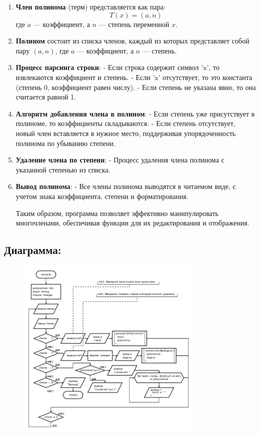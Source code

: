 \documentclass[14pt,a4paper]{article}
\begin{document}
\begin{enumerate}
\item \textbf{Член полинома} (терм) представляется как пара:
\[
T(x) = (a, n)
\]
где \(a\) — коэффициент, а \(n\) — степень переменной \(x\).

\item \textbf{Полином} состоит из списка членов, каждый из которых представляет собой пару \((a, n)\), где \(a\) — коэффициент, а \(n\) — степень.

\item \textbf{Процесс парсинга строки}:
    - Если строка содержит символ 'x', то извлекаются коэффициент и степень.
    - Если 'x' отсутствует, то это константа (степень 0, коэффициент равен числу).
    - Если степень не указана явно, то она считается равной 1.

\item \textbf{Алгоритм добавления члена в полином}:
    - Если степень уже присутствует в полиноме, то коэффициенты складываются.
    - Если степень отсутствует, новый член вставляется в нужное место, поддерживая упорядоченность полинома по убыванию степени.

\item \textbf{Удаление члена по степени}:
    - Процесс удаления члена полинома с указанной степенью из списка.

\item \textbf{Вывод полинома}:
    - Все члены полинома выводятся в читаемом виде, с учетом знака коэффициента, степени и форматирования.

Таким образом, программа позволяет эффективно манипулировать многочленами, обеспечивая функции для их редактирования и отображения.
\end{enumerate}
\subsection{Диаграмма:}
\begin{figure}[h]
    \centering
    \includegraphics[width=0.8\textwidth]{data/diagram16_3.png}
\end{figure}
\end{document}
